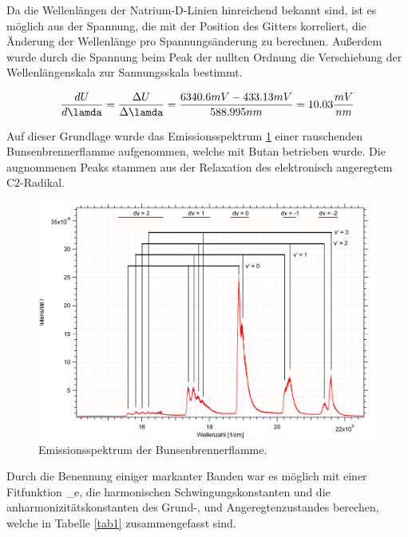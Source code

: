 


Da die Wellenlängen der Natrium-D-Linien hinreichend bekannt sind, ist es möglich aus der Spannung, die mit der Position des Gitters korreliert, die Änderung der Wellenlänge pro Spannungsänderung zu berechnen. Außerdem wurde durch die Spannung beim Peak der nullten Ordnung die Verschiebung der Wellenlängenskala zur Sannungsskala bestimmt.

\begin {equation}
\frac{dU}{d\lamda}=\frac{\Delta U}{\Delta\lamda}=\frac{6340.6 mV - 433.13 mV}{588.995 nm}=10.03 \frac{mV}{nm}
\end {equation}


Auf dieser Grundlage wurde das Emissionsspektrum \ref{Bunsen} einer rauschenden Bunsenbrennerflamme aufgenommen, welche mit Butan betrieben wurde. Die augnommenen Peaks stammen aus der Relaxation des elektronisch angeregtem C2-Radikal.



\begin{figure}[H]
	\centering	
	\begin{minipage}{1\textwidth}
	\includegraphics[width=\columnwidth]{Bilder/Graph3.png}
	\end{minipage}
	
	
	\caption{Emissionsspektrum der Bunsenbrennerflamme.}
	

	\label{Bunsen}
\end{figure}

Durch die Benennung einiger markanter Banden war es möglich mit einer Fitfunktion \nu_e, die harmonischen Schwingungskonstanten und die anharmonizitätskonstanten des Grund-, und Angeregtenzustandes berechen, welche in Tabelle  \ref{tab1} zusammengefasst sind.


